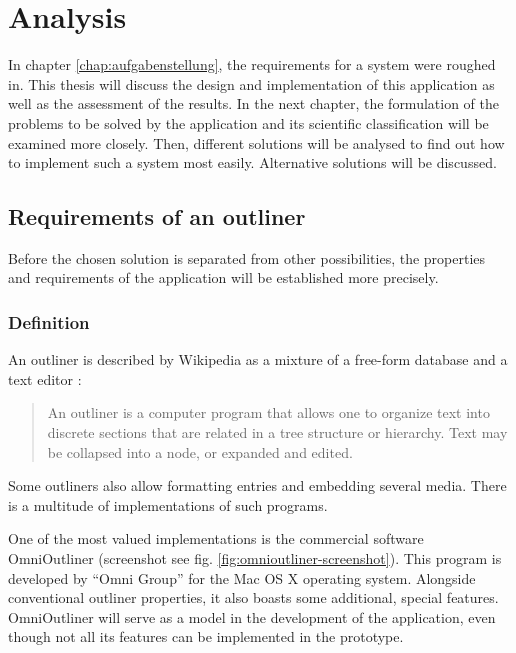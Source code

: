 \chapter{Analysis}
\label{chap:analyse}

In chapter \ref{chap:aufgabenstellung}, the requirements for a system were roughed in. This thesis will discuss the design and implementation of this application as well as the assessment of the results. In the next chapter, the formulation of the problems to be solved by the application and its scientific classification will be examined more closely. Then, different solutions will be analysed to find out how to implement such a system most easily. Alternative solutions will be discussed.

\section{Requirements of an outliner}

Before the chosen solution is separated from other possibilities, the properties and requirements of the application will be established more precisely.

\subsection{Definition}

An outliner is described by Wikipedia as a mixture of a free-form database and a text editor \cite{gliederungseditor}:

\begin{quote}
An outliner is a computer program that allows one to organize text into discrete sections that are related in a tree structure or hierarchy. Text may be collapsed into a node, or expanded and edited. \cite{outliner}
\end{quote}

Some outliners also allow formatting entries and embedding several media. There is a multitude of implementations of such programs.

One of the most valued implementations \cite{omnioutliner:rating} is the commercial software OmniOutliner \cite{omnioutliner:website} (screenshot see fig. \ref{fig:omnioutliner-screenshot}). This program is developed by \enquote{Omni Group} for the Mac OS X operating system. Alongside conventional outliner properties, it also boasts some additional, special features. OmniOutliner will serve as a model in the development of the application, even though not all its features can be implemented in the prototype.


